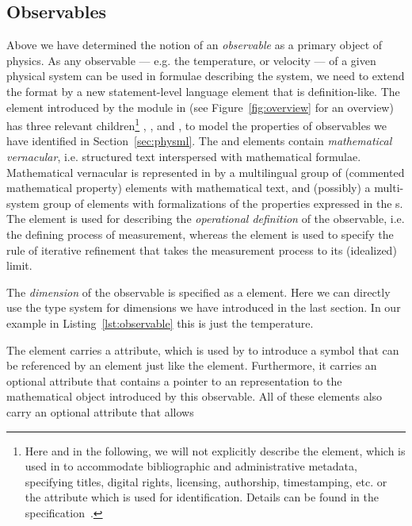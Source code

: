 \subsection{Observables}\label{subsec:observables}

Above we have determined the notion of an {\emph{observable}} as a primary object of
physics. As any observable --- e.g. the temperature, or velocity --- of a given physical
system can be used in formulae describing the system, we need to extend the {\omdoc}
format by a new statement-level language element that is definition-like. The
{} element introduced by the {\physml} module in {\omdoc} (see
Figure~\ref{fig:overview} for an overview) has three relevant children\footnote{Here and
  in the following, we will not explicitly describe the {} element,
  which is used in {\omdoc} to accommodate bibliographic and administrative metadata,
  specifying titles, digital rights, licensing, authorship, timestamping, etc. or the
  {} attribute which is used for identification. Details
  can be found in the {\omdoc} specification~\cite{Kohlhase:omdoc1.2}.} {},
{}, and {}, to model the properties of observables we
have identified in Section~\ref{sec:physml}. The {} and {}
elements contain {\emph{mathematical vernacular}}, i.e. structured text interspersed with
mathematical formulae. Mathematical vernacular is represented in {\omdoc} by a
multilingual group of {} (commented mathematical property) elements with
mathematical text, and (possibly) a multi-system group of {} elements with
formalizations of the properties expressed in the {}s. The {}
element is used for describing the {\emph{operational definition}} of the observable,
i.e. the defining process of measurement, whereas the {} element is
used to specify the rule of iterative refinement that takes the measurement process to
its (idealized) limit.

The {\emph{dimension}} of the observable is specified as a {} element. Here
we can directly use the type system for dimensions we have introduced in the last section.
In our example in Listing~\ref{lst:observable} this is just the temperature.

The {} element carries a {} attribute,
which is used by {\omdoc} to introduce a symbol that can be referenced by an
{} element just like the {} element. Furthermore, it carries
an optional {} attribute that contains a pointer to an
{\omdoc} representation to the mathematical object introduced by this observable.
All of these elements also carry an optional {} attribute that allows

